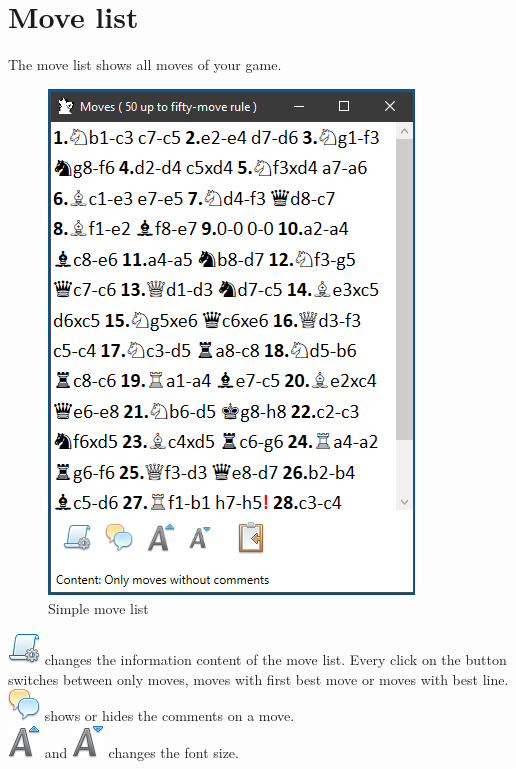 \documentclass[11pt,a4paper]{article}
\begin{document}
\section{Move list}
The move list shows all moves of your game.
\begin{figure}[H]
	\centering
	\includegraphics[scale=1.0]{movelist1.png}
	\caption{Simple move list}
	\label{fig:moveList1}
\end{figure}

\includegraphics[scale=0.5]{script_gear.png} changes the information content of the move list. Every click on the button switches between only moves, moves with first best move or moves with best line.\\

\includegraphics[scale=0.5]{comments.png} shows or hides the comments on a move.\\

\includegraphics[scale=0.5]{font_size_decrease.png} and \includegraphics[scale=0.5]{font_size_increase.png} changes the font size.\\
\end{document}
